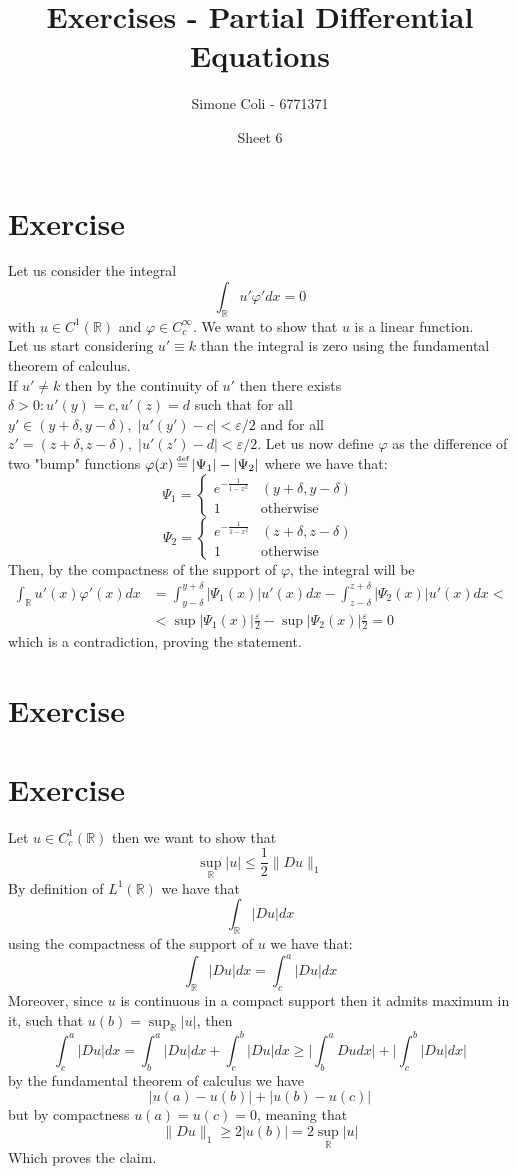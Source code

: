 \documentclass{article}
\title{Exercises - Partial Differential Equations}
\author{Simone Coli - 6771371}
\date{Sheet 6}
\newcommand{\R}{\mathbb{R}}
\newcommand*{\eqdef}{\ensuremath{\overset{\mathclap{\text{\tiny def}}}{=}}}
\begin{document}
\maketitle

\section{Exercise}
Let us consider the integral
\[
    \int_{\R} u' \varphi' dx = 0
\]
with $u \in C^1 (\R)$ and $\varphi \in C^\infty_c$. We want to show that $u$ is a linear function.\\
Let us start considering $u' \equiv k$ than the integral is zero using the fundamental theorem of calculus.
\\
If $u' \neq k$ then by the continuity of $u'$ then there exists $\delta >0 : u'(y) = c, u'(z) = d$ such that for all $y' \in (y+\delta , y- \delta),\; |u'(y')-c| < \varepsilon / 2$ and for all $z' = (z+\delta , z-\delta),\; |u'(z')- d|< \varepsilon /2 $. Let us now define $\varphi$ as the difference of two "bump" functions $\varphi(x) \eqdef |\Psi_1| - |\Psi_2|$ where we have that:
\[
    \Psi_1 = \begin{cases}
        e^{-\frac{1}{1-x^2}} & (y+\delta , y- \delta)\\
        1 & \text{otherwise}
    \end{cases}
\]
\[
    \Psi_2 = \begin{cases}
        e^{-\frac{1}{1-x^2}} & (z+\delta , z- \delta)\\
        1 & \text{otherwise}
    \end{cases}
\]
Then, by the compactness of the support of $\varphi$, the integral will be
\[
    \begin{split}
        \int_\R u' (x) \varphi'(x)dx & = \int_{y- \delta}^{y+ \delta} | \Psi_1 (x)| u'(x) dx - \int_{z- \delta}^{z+ \delta} |\Psi_2 (x)| u'(x) dx <\\
        &< \sup|\Psi_1 (x)| \frac{\varepsilon}{2} - \sup|\Psi_2 (x)| \frac{\varepsilon}{2} = 0
    \end{split}
\]
which is a contradiction, proving the statement.
\section{Exercise}
\section{Exercise}
Let $u \in C^1_c (\R)$ then we want to show that
\[
    \sup_{\R} |u| \leq\frac{1}{2} \| Du\|_1
\]
By definition of $L^1(\R)$ we have that
\[
    \int_\R |Du| dx
\]
using the compactness of the support of $u$ we have that:
\[
    \int_\R |Du| dx = \int_c^a |Du| dx
\]
Moreover, since $u$ is continuous in a compact support then it admits maximum in it, such that $u(b) = \sup_{\R} |u|$, then
\[
    \int_c^a |Du| dx = \int_b^a |Du| dx + \int_c^b |Du| dx \geq \bigg| \int_b^a Du dx \bigg| + \bigg| \int_c^b |Du| dx \bigg|
\]
by the fundamental theorem of calculus we have
\[
    |u(a)- u(b)| + |u(b)-u(c)|
\]
but by compactness $u(a) = u(c) = 0$, meaning that
\[
    \| Du \|_1 \geq 2 |u(b)| = 2 \sup_\R|u|
\]
Which proves the claim.
\end{document}
